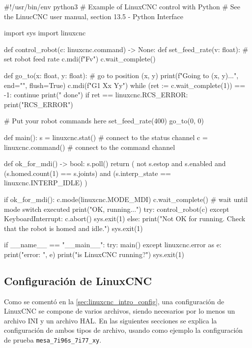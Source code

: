 \documentclass[english,spanish,a4paper,11pt]{article}
\begin{document}
\begin{listingtitledbox}[
    title=Ejemplo de uso de Python para interactuar con LinuxCNC,
    label=lst:linuxcnc_python,
][
    basicstyle=\ttfamily\footnotesize,
    language=Python,
]
#!/usr/bin/env python3
# Example of LinuxCNC control with Python
# See the LinucCNC user manual, section 13.5 - Python Interface

import sys
import linuxcnc


def control_robot(c: linuxcnc.command) -> None:
    def set_feed_rate(v: float):
        # set robot feed rate
        c.mdi(f"F{v}")
        c.wait_complete()

    def go_to(x: float, y: float):
        # go to position (x, y)
        print(f"Going to ({x}, {y})...", end="", flush=True)
        c.mdi(f"G1 X{x} Y{y}")
        while (ret := c.wait_complete(1)) == -1:
            continue
        print(" done")
        if ret == linuxcnc.RCS_ERROR:
            print("RCS_ERROR")

    # Put your robot commands here
    set_feed_rate(400)
    go_to(0, 0)


def main():
    s = linuxcnc.stat()  # connect to the status channel
    c = linuxcnc.command()  # connect to the command channel

    def ok_for_mdi() -> bool:
        s.poll()
        return (
            not s.estop
            and s.enabled
            and (s.homed.count(1) == s.joints)
            and (s.interp_state == linuxcnc.INTERP_IDLE)
        )

    if ok_for_mdi():
        c.mode(linuxcnc.MODE_MDI)
        c.wait_complete()  # wait until mode switch executed
        print("OK, running...")
        try:
            control_robot(c)
        except KeyboardInterrupt:
            c.abort()
            sys.exit(1)
    else:
        print("Not OK for running. Check that the robot is homed and idle.")
        sys.exit(1)


if __name__ == "__main__":
    try:
        main()
    except linuxcnc.error as e:
        print("error: ", e)
        print("is LinuxCNC running?")
        sys.exit(1)
\end{listingtitledbox}


\subsection{Configuración de LinuxCNC}
\label{sec:linuxcnc_configuration}

Como se comentó en la \cref{sec:linuxcnc_intro_config}, una configuración de LinuxCNC se compone de varios archivos, siendo necesarios por lo menos un archivo INI y un archivo HAL. En las siguientes secciones se explica la configuración de ambos tipos de archivo, usando como ejemplo la configuración de prueba \texttt{mesa\_7i96s\_7i77\_xy}.
\end{document}
